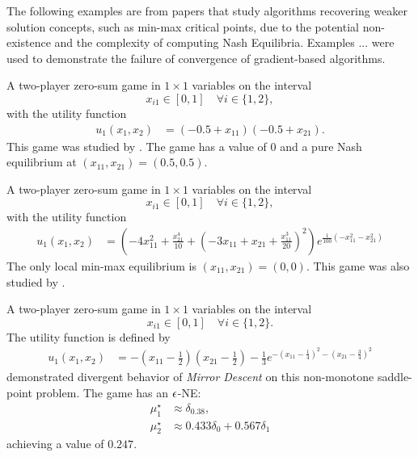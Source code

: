 

The following examples are from papers that study algorithms recovering weaker solution concepts, such as min-max critical points, due to the potential non-existence and the complexity of computing Nash Equilibria. Examples ... were used to demonstrate the failure of convergence of gradient-based algorithms.

\begin{game}\label{ex.daskalakis.d}
A two-player zero-sum game in $1 \times 1$ variables on the interval
$$x_{i1} \in [0,1] \quad \forall i \in \{1, 2\},$$
with the utility function
\begin{align*}
u_{1}\left( x_{1}, x_{2} \right) &= \left( -0.5 + x_{11} \right) \left( -0.5 + x_{21} \right).
\end{align*}
This game was studied by \textcite[Appendix D]{daskalakis.golowich.ea:stay-on-the-ridge}. The game has a value of $0$ and a pure Nash equilibrium at $(x_{11},x_{21}) = (0.5, 0.5)$.
\end{game}

\begin{game}\label{ex.daskalakis.e.1st}
A two-player zero-sum game in $1 \times 1$ variables on the interval
$$x_{i1} \in [0,1] \quad \forall i \in \{1, 2\},$$
with the utility function \cite[Appendix E]{daskalakis.golowich.ea:stay-on-the-ridge}
\begin{align*}
u_{1}\left( x_{1}, x_{2} \right) &= \left(  - 4 x_{11}^{2} + \frac{x_{21}^{4}}{10} + \left(  - 3 x_{11} + x_{21} + \frac{x_{11}^{3}}{20} \right)^{2} \right) e^{\frac{1}{100} \left(  - x_{11}^{2} - x_{21}^{2} \right)}
\end{align*}
The only local min-max equilibrium is $(x_{11},x_{21}) = (0, 0)$. This game was also studied by \textcite{Chinchilla2024,wang2019solvingminimaxoptimizationlocally,zheng.zhu.ea:universal}.
\end{game}


\begin{game}\label{ex.mertikopoulos18.fig1}
A two-player zero-sum game in $1 \times 1$ variables on the interval
$$x_{i1} \in [0,1] \quad \forall i \in \{1,2\}.$$
The utility function is defined by
\begin{align*}
u_{1}\left( x_{1}, x_{2} \right) &= -\left(x_{11}-\frac{1}{2}\right)\left(x_{21}-\frac{1}{2}\right)-\frac{1}{3}e^{-\left(x_{11}-\frac{1}{4}\right)^2-\left(x_{21}-\frac{3}{4}\right)^2}
\end{align*}
\textcite[Fig. 1]{mertikopoulos.lecouat.ea:optimistic} demonstrated divergent behavior of \emph{Mirror Descent} on this non-monotone saddle-point problem. The game has an $\epsilon$-NE:
\begin{align*}
\mu_1^\star &\approx \delta_{0.38},\\
\mu_2^\star &\approx 0.433\delta_{0} + 0.567\delta_{1}
\end{align*}
achieving a value of $0.247$.
\end{game}

